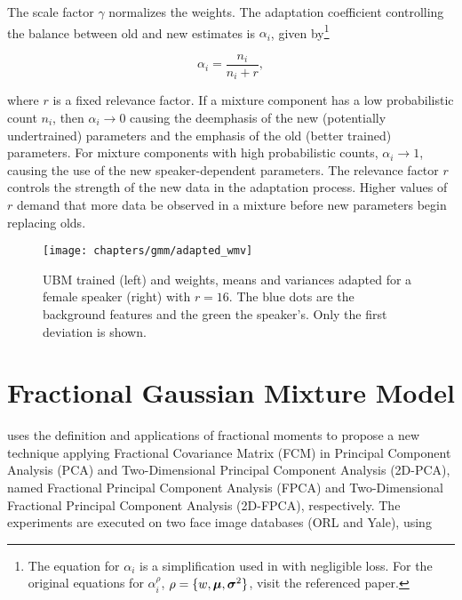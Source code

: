 \noindent The scale factor $\gamma$ normalizes the weights. \noindent The adaptation coefficient controlling the balance between old and new estimates is $\alpha_i$, given by\footnote{The equation for $\alpha_i$ is a simplification used in  with negligible loss. For the original equations for $\alpha_i^\rho$, $\rho = \{w, \boldsymbol{\mu}, \boldsymbol{\sigma}^2\}$, visit the referenced paper.}

\begin{equation}
    \alpha_i = \frac{n_i}{n_i + r},
    \label{eq:alpha_i}
\end{equation}

\noindent where $r$ is a fixed relevance factor. If a mixture component has a low probabilistic count $n_i$, then $\alpha_i \to 0$ causing the deemphasis of the new (potentially undertrained) parameters and the emphasis of the old (better trained) parameters. For mixture components with high probabilistic counts, $\alpha_i \to 1$, causing the use of the new speaker-dependent parameters. The relevance factor $r$ controls the strength of the new data in the adaptation process. Higher values of $r$ demand that more data be observed in a mixture before new parameters begin replacing olds.

\begin{figure}[ht]
    \centering
    \texttt{[image: chapters/gmm/adapted\_wmv]}
    \caption{UBM trained (left) and weights, means and variances adapted for a female speaker (right) with $r = 16$. The blue dots are the background features and the green the speaker's. Only the first deviation is shown.}
    \label{fig:adapted_wmv}
\end{figure}

\section{Fractional Gaussian Mixture Model}
\label{sec:frac-gmm}

 uses the definition and applications of fractional moments to propose a new technique applying Fractional Covariance Matrix (FCM) in Principal Component Analysis (PCA) and Two-Dimensional Principal Component Analysis (2D-PCA), named Fractional Principal Component Analysis (FPCA) and Two-Dimensional Fractional Principal Component Analysis (2D-FPCA), respectively. The experiments are executed on two face image databases (ORL and Yale), using

